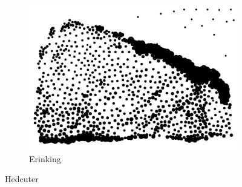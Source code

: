 \documentclass[11pt]{article}
\begin{document}
\begin{enumerate}
\begin{figure}[H]
\begin{subfigure}{0.3\textwidth}
        \includegraphics[width=\textwidth]{../results/hedcuter/4-3.pdf}
         \caption{Erinking}
    \end{subfigure}
        \caption{Hedcuter}
            \label{fig:type_h}
\end{figure}


\end{enumerate}
\end{document}

